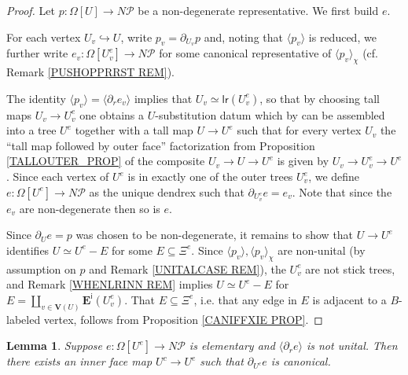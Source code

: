 \documentclass[a4paper,10pt
,draft
]{article}%
\numberwithin{equation}{section}
\numberwithin{figure}{section}
\newtheorem{lemma}[equation]{Lemma}%
\theoremstyle{definition} %
\newcommand{\1}{\ensuremath{\mathbbm 1}}%
\begin{document}
\begin{proof}
	Let $p\colon \Omega[U] \to N \mathcal{P}$
	be a non-degenerate representative. We first build $e$.
	
	For each vertex $U_v \hookrightarrow U$, write
	$p_v = \partial_{U_v} p$
	and,
	noting that $\langle p_v \rangle$ is reduced,
	we further write 
	$e_v \colon \Omega[U^e_v] \to N \mathcal{P}$
	for some canonical representative of 
	$\langle p_v \rangle_{\chi}$
	(cf. Remark \ref{PUSHOPPRRST REM}).
	
	
	The identity
	$\langle p_v \rangle = \langle \partial_r e_v \rangle$
	implies that
	$U_v \simeq \mathsf{lr}(U^e_v)$,
	so that by choosing tall maps $U_v \to U^e_v$ 
	one obtains a $U$-substitution datum
	\cite[Def. 3.38]{BP_geo}
	which by 
	\cite[Prop. 3.41]{BP_geo}
	can be assembled into a tree $U^e$
	together with a tall map
	$U \to U^e$ such that for every vertex $U_v$
	the ``tall map followed by outer face'' factorization from Proposition \ref{TALLOUTER_PROP} of
	the composite
	$U_v \to U \to U^e$
	is given by
	$U_v \to U^e_v \to U^e$.
	Since each vertex of $U^e$ is in exactly one of the outer trees $U^e_v$,
	we define $e \colon \Omega[U^e] \to N \mathcal{P}$
	as the unique dendrex such that
	$\partial_{U^e_v} e = e_v$.
	Note that since the $e_v$ are non-degenerate 
	then so is $e$.
	
	
	Since $\partial_{U}e = p$ was chosen to be non-degenerate,
	it remains to show that
	$U \to U^e$ identifies $U \simeq U^e - E$
	for some $E \subseteq \Xi^{e}$.
	Since $\langle p_v \rangle, \langle p_v \rangle_{\chi}$ are non-unital
	(by assumption on $p$ and Remark \ref{UNITALCASE REM}),
	the $U^e_v$ are not stick trees,
	and Remark \ref{WHENLRINN REM} implies
	$U \simeq U^e-E$ for 
	$E = \amalg_{v \in \boldsymbol{V}(U)} \boldsymbol{E}^{\mathsf{i}}(U^e_v)$.
	That
	$E \subseteq \Xi^{e}$, i.e. that any edge in $E$ is adjacent to a $B$-labeled vertex,
	follows from Proposition \ref{CANIFFXIE PROP}.
\end{proof}


\begin{lemma}\label{FORSAKEN LEM}
	Suppose $e \colon \Omega[U^e] \to N \mathcal{P}$ is elementary
	and $\langle \partial_r e\rangle$ is not unital.
	Then there exists an inner face map
	$U^c \to U^e$ such that $\partial_{U^c} e$ is canonical.
	
\end{lemma}
\end{document}
